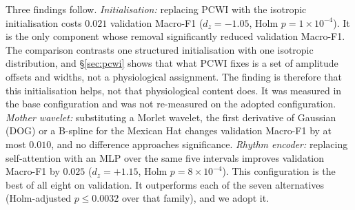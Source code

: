 \documentclass[preprint,12pt]{elsarticle}
\begin{document}
\begin{table}[!htbp]
\centering
\caption{Single-variable component ablation on \textbf{DS1 validation}, 20 seeds per row. Base configuration: PCWI, gated side branch, self-attention rhythm encoder and CBS; validation Macro-F1 $0.4145\pm0.0201$. $\Delta$ and $d_z$ are variant minus base, so positive values favour the variant. $p$ is Holm-adjusted across the seven comparisons. Removing the side branch also removes 34,816 parameters (22.6\% of the base model). DOG: first derivative of Gaussian.}
\label{tab:family_ablation}
\footnotesize
{}
\end{table}

Three findings follow. \emph{Initialisation:} replacing PCWI with the isotropic initialisation costs $0.021$ validation Macro-F1 ($d_z = -1.05$, Holm $p = 1\times10^{-4}$). It is the only component whose removal significantly reduced validation Macro-F1. The comparison contrasts one structured initialisation with one isotropic distribution, and \S\ref{sec:pcwi} shows that what PCWI fixes is a set of amplitude offsets and widths, not a physiological assignment. The finding is therefore that this initialisation helps, not that physiological content does. It was measured in the base configuration and was not re-measured on the adopted configuration. \emph{Mother wavelet:} substituting a Morlet wavelet, the first derivative of Gaussian (DOG) or a B-spline for the Mexican Hat changes validation Macro-F1 by at most $0.010$, and no difference approaches significance. \emph{Rhythm encoder:} replacing self-attention with an MLP over the same five intervals improves validation Macro-F1 by $0.025$ ($d_z = +1.15$, Holm $p = 8\times10^{-4}$). This configuration is the best of all eight on validation. It outperforms each of the seven alternatives (Holm-adjusted $p \leq 0.0032$ over that family), and we adopt it.
\end{document}
